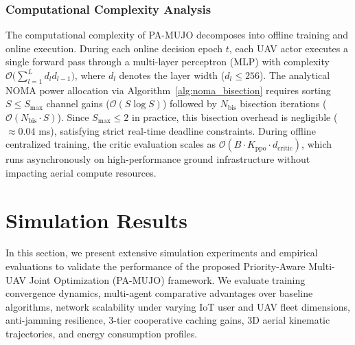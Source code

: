 \documentclass[journal]{IEEEtran}
\begin{document}
\subsubsection{Computational Complexity Analysis}
The computational complexity of PA-MUJO decomposes into offline training and online execution. During each online decision epoch $t$, each UAV actor executes a single forward pass through a multi-layer perceptron (MLP) with complexity $\mathcal{O}\bigl(\sum_{l=1}^L d_l d_{l-1}\bigr)$, where $d_l$ denotes the layer width ($d_l \le 256$). The analytical NOMA power allocation via Algorithm~\ref{alg:noma_bisection} requires sorting $S \le S_{\max}$ channel gains ($\mathcal{O}(S \log S)$) followed by $N_{\mathrm{bis}}$ bisection iterations ($\mathcal{O}(N_{\mathrm{bis}} \cdot S)$). Since $S_{\max} \le 2$ in practice, this bisection overhead is negligible ($\approx 0.04$ ms), satisfying strict real-time deadline constraints. During offline centralized training, the critic evaluation scales as $\mathcal{O}(B \cdot K_{\mathrm{ppo}} \cdot d_{\mathrm{critic}})$, which runs asynchronously on high-performance ground infrastructure without impacting aerial compute resources.


\section{Simulation Results}
\label{section_V}

In this section, we present extensive simulation experiments and empirical evaluations to validate the performance of the proposed Priority-Aware Multi-UAV Joint Optimization (PA-MUJO) framework. We evaluate training convergence dynamics, multi-agent comparative advantages over baseline algorithms, network scalability under varying IoT user and UAV fleet dimensions, anti-jamming resilience, 3-tier cooperative caching gains, 3D aerial kinematic trajectories, and energy consumption profiles.
\end{document}
